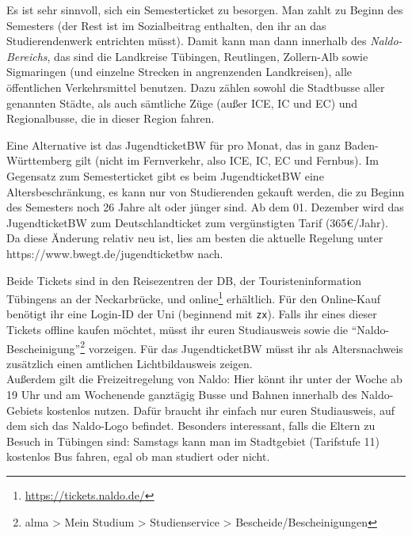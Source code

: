 

Es ist sehr sinnvoll, sich ein Semesterticket zu besorgen.  Man zahlt
  zu Beginn des Semesters \semesterticketpreis (der Rest ist im Sozialbeitrag
  enthalten, den ihr an das Studierendenwerk entrichten müsst).  Damit
  kann man dann innerhalb des \emph{Naldo-Bereichs}, das sind die
  Landkreise Tübingen, Reutlingen, Zollern-Alb sowie Sigmaringen
  (und einzelne Strecken in angrenzenden Landkreisen), alle
  öffentlichen Verkehrsmittel benutzen. Dazu zählen sowohl die
  Stadtbusse aller genannten Städte, als auch sämtliche Züge (außer ICE, IC und EC) und
  Regionalbusse, die in dieser Region fahren.

Eine Alternative ist das JugendticketBW für \jugendticketbwpreis pro Monat,
  das in ganz Baden-Württemberg gilt (nicht im Fernverkehr, also ICE, IC, EC und Fernbus).
  Im Gegensatz zum Semesterticket gibt es beim JugendticketBW eine Altersbeschränkung,
  es kann nur von Studierenden gekauft werden, die zu Beginn des Semesters noch 26 Jahre alt oder jünger sind.
  Ab dem 01. Dezember wird das JugendticketBW zum Deutschlandticket zum vergünstigten Tarif (365€/Jahr).
  Da diese Änderung relativ neu ist, lies am besten die aktuelle Regelung unter https://www.bwegt.de/jugendticketbw nach.

Beide Tickets sind in den Reisezentren der DB, der Touristeninformation Tübingens an der Neckarbrücke, und
  online\footnote{\url{https://tickets.naldo.de/}} erhältlich.
  Für den Online-Kauf benötigt ihr eine Login-ID der Uni (beginnend mit \texttt{zx}). Falls ihr eines
  dieser Tickets offline kaufen möchtet, müsst ihr euren Studiausweis sowie die "`Naldo-Bescheinigung"'\footnote{alma > Mein Studium > Studienservice > Bescheide/Bescheinigungen}
  vorzeigen. Für das JugendticketBW müsst ihr als Altersnachweis zusätzlich einen amtlichen Lichtbildausweis zeigen. \\
  Außerdem gilt die Freizeitregelung von Naldo: Hier könnt ihr unter der Woche ab 19 Uhr und am Wochenende ganztägig
  Busse und Bahnen innerhalb des Naldo-Gebiets kostenlos nutzen. Dafür braucht ihr einfach nur euren Studiausweis, auf
  dem sich das Naldo-Logo befindet.
  Besonders interessant, falls die Eltern zu Besuch in Tübingen sind: Samstags kann man im Stadtgebiet (Tarifstufe 11) kostenlos Bus fahren, egal ob man studiert oder nicht.

